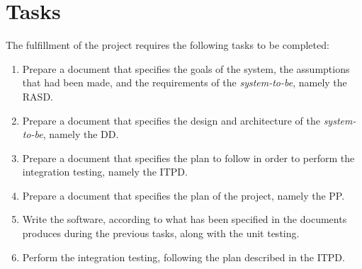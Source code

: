 \section{Tasks} %
\label{sec:tasks}

The fulfillment of the project requires the following tasks to be completed:

\begin{enumerate}
	\item Prepare a document that specifies the goals of the system, the assumptions that had been made, and the requirements of the \emph{system-to-be}, namely the RASD.
	\item Prepare a document that specifies the design and architecture of the \emph{system-to-be}, namely the DD.
	\item Prepare a document that specifies the plan to follow in order to perform the integration testing, namely the ITPD.
	\item Prepare a document that specifies the plan of the project, namely the PP.
	\item Write the software, according to what has been specified in the documents produces during the previous tasks, along with the unit testing.
	\item Perform the integration testing, following the plan described in the ITPD.
\end{enumerate}



